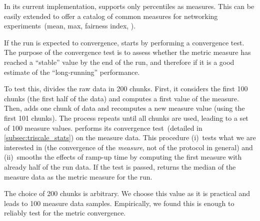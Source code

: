 %


In its current implementation, \triscale supports only percentiles as measures.
This can be easily extended to offer a catalog of common measures for networking experiments~(mean, max, fairness index, \etc).

If the run is expected to convergence, \triscale starts by performing a convergence test.
The purpose of the convergence test is to assess whether the metric measure has reached a ``stable'' value by the end of the run, and therefore if it is a good estimate of the ``long-running'' performance.

To test this, \triscale divides the raw data in 200 chunks. First, it considers the first 100 chunks (\ie the first half of the data) and computes a first value of the measure. Then, \triscale adds one chunk of data and recomputes a new measure value (\ie using the first 101 chunks). The process repeats until all chunks are used, leading to a set of 100 measure values. \triscale performs its convergence test~(detailed in \cref{subsec:triscale_stats}) on the measure data.
This procedure (i)~tests what we are interested in (\ie the convergence of the \emph{measure}, not of the protocol in general) and (ii)~smooths the effects of ramp-up time by computing the first measure with already half of the run data.
If the test is passed, \triscale returns the median of the measure data as the metric measure for the run.

\begin{remark}
  The choice of 200 chunks is arbitrary. We choose this value as it is practical and leads to 100 measure data samples. Empirically, we found this is enough to reliably test for the metric convergence.
\end{remark}

